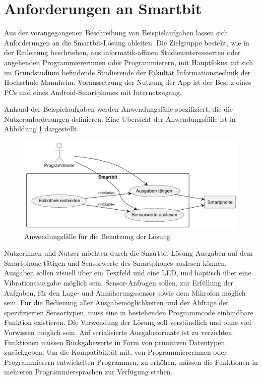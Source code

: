 \documentclass[11pt,a4paper]{report}
\begin{document}
\section{Anforderungen an Smartbit}\label{sec:anforderungen}
Aus der vorangegangenen Beschreibung von Beispielaufgaben lassen sich Anforderungen an die Smartbit-Lösung ableiten.
Die Zielgruppe besteht, wie in der Einleitung beschrieben, aus informatik-affinen Studieninteressierten oder angehenden Programmiererinnen oder Programmierern, mit Hauptfokus auf sich im Grundstudium befindende Studierende der Fakultät Informationstechnik der Hochschule Mannheim.
Voraussetzung der Nutzung der App ist der Besitz eines PCs und eines Android-Smartphones  mit Internetzugang.

Anhand der Beispielaufgaben werden Anwendungsfälle spezifiziert, die die Nutzeranforderungen definieren.
Eine Übersicht der Anwendungsfälle ist in Abbildung \ref{fig:usecase} dargestellt.
\begin{figure}[htbp]
  \centering
  \includegraphics[width=.8\textwidth]{images/usecase_usage.pdf}
  \caption{Anwendungsfälle für die Benutzung der Lösung}
  \label{fig:usecase}
\end{figure}
Nutzerinnen und Nutzer möchten durch die Smartbit-Lösung Ausgaben auf dem Smartphone tätigen und Sensorwerte des Smartphones auslesen können.
Ausgaben sollen visuell über ein Textfeld und eine LED, und haptisch über eine Vibrationsausgabe möglich sein.
Sensor-Anfragen sollen, zur Erfüllung der Aufgaben, für den Lage- und Annäherungssensor sowie dem Mikrofon möglich sein.
Für die Bedienung aller Ausgabemöglichkeiten und der Abfrage der spezifizierten Sensortypen, muss eine in bestehenden Programmcode einbindbare Funktion existieren.
Die Verwendung der Lösung soll verständlich und ohne viel Vorwissen möglich sein.
Auf serialisierte Ausgabeformate ist zu verzichten.
Funktionen müssen Rückgabewerte in Form von primitiven Datentypen zurückgeben.
Um die Kompatibilität mit, von Programmiererinnen oder Programmierern entwickelten Programmen, zu erhöhen, müssen die Funktionen in mehreren Programmiersprachen zur Verfügung stehen.
\end{document}
